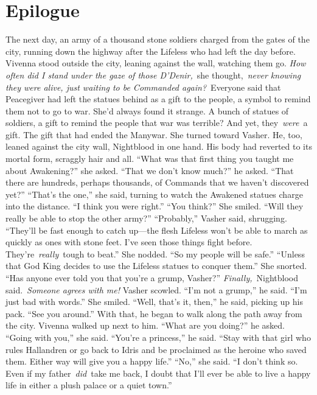 \section{Epilogue}

The next day, an army of a thousand stone soldiers charged from the gates of the city, running down the highway after the Lifeless who had left the day before.
Vivenna stood outside the city, leaning against the wall, watching them go.
\textit{How often did I stand under the gaze of those D’Denir,}~she thought,~\textit{never knowing they were alive, just waiting to be Commanded again?}~Everyone said that Peacegiver had left the statues behind as a gift to the people, a symbol to remind them not to go to war. She’d always found it strange. A bunch of statues of soldiers, a gift to remind the people that war was terrible?
And yet, they~\textit{were}~a gift. The gift that had ended the Manywar.
She turned toward Vasher. He, too, leaned against the city wall, Nightblood in one hand. His body had reverted to its mortal form, scraggly hair and all.
“What was that first thing you taught me about Awakening?” she asked.
“That we don’t know much?” he asked. “That there are hundreds, perhaps thousands, of Commands that we haven’t discovered yet?”
“That’s the one,” she said, turning to watch the Awakened statues charge into the distance. “I think you were right.”
“You think?” She smiled. “Will they really be able to stop the other army?”
“Probably,” Vasher said, shrugging. “They’ll be fast enough to catch up—the flesh Lifeless won’t be able to march as quickly as ones with stone feet. I’ve seen those things fight before. They’re~\textit{really}~tough to beat.”
She nodded. “So my people will be safe.”
“Unless that God King decides to use the Lifeless statues to conquer them.”
She snorted. “Has anyone ever told you that you’re a grump, Vasher?”
\textit{Finally,}~Nightblood said.~\textit{Someone agrees with me!}
Vasher scowled. “I’m not a grump,” he said. “I’m just bad with words.”
She smiled.
“Well, that’s it, then,” he said, picking up his pack. “See you around.” With that, he began to walk along the path away from the city.
Vivenna walked up next to him.
“What are you doing?” he asked.
“Going with you,” she said.
“You’re a princess,” he said. “Stay with that girl who rules Hallandren or go back to Idris and be proclaimed as the heroine who saved them. Either way will give you a happy life.”
“No,” she said. “I don’t think so. Even if my father~\textit{did}~take me back, I doubt that I’ll ever be able to live a happy life in either a plush palace or a quiet town.”
